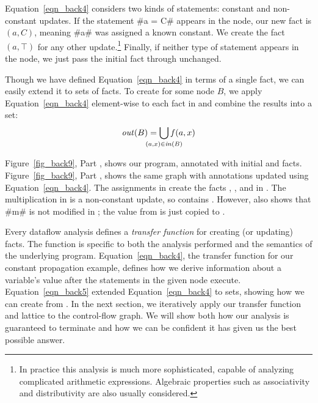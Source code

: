 \documentclass[12pt]{report}
\begin{document}
Equation~\eqref{eqn_back4} considers two kinds of statements: constant
and non-constant updates. If the statement #a = C# appears in the
node, our new fact is $(a,C)$, meaning #a# was assigned a known
constant. We create the fact $(a,\top)$ for any other
update.\footnote{In practice this analysis is much more sophisticated,
  capable of analyzing complicated arithmetic expressions. Algebraic
  properties such as associativity and distributivity are also usually
  considered.} Finally, if neither type of statement appears in the
node, we just pass the initial fact through unchanged.

Though we have defined Equation~\eqref{eqn_back4} in terms of a single
fact, we can easily extend it to sets of facts. To create \outBa for
some node $B$, we apply Equation~\eqref{eqn_back4} element-wise to
each fact in \inBa and combine the results into a set:
\begin{equation}
  \outBa = \bigcup\limits_{\mathclap{(a,x) \in \inBa}} f(a,x)
  \label{eqn_back5}
\end{equation}

Figure~\ref{fig_back9}, Part , shows our
program, annotated with initial \inE and \out
facts. Figure~\ref{fig_back9}, Part , shows
the same graph with annotations updated using
Equation~\eqref{eqn_back4}. The assignments in
 create the facts ,
, and  in . The
multiplication in  is a non-constant update,
so  contains . However,
 also shows that #m# is not modified in
; the value from  is
just copied to .

\afterpage{\clearpage\clearpage}

Every dataflow analysis defines a \emph{transfer function} for
creating (or updating) facts. The function is specific to both the
analysis performed and the semantics of the underlying
program. Equation~\ref{eqn_back4}, the transfer function for our
constant propagation example, defines how we derive information about
a variable's value after the statements in the given node execute.
Equation~\ref{eqn_back5} extended Equation~\ref{eqn_back4} to sets,
showing how we can create \outBa from \inBa. In the next section, we
iteratively apply our transfer function and lattice to the
control-flow graph. We will show both how our analysis is guaranteed
to terminate and how we can be confident it has given us the best
possible answer.
\end{document}
